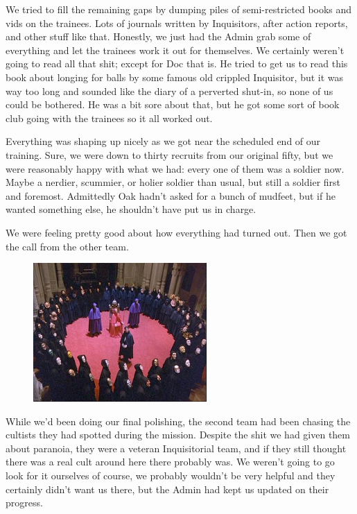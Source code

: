 We tried to fill the remaining gaps by dumping piles of semi-restricted books and vids on the trainees. 
Lots of journals written by Inquisitors, after action reports, and other stuff like that. 
Honestly, we just had the Admin grab some of everything and let the trainees work it out for themselves. 
We certainly weren’t going to read all that shit; 
except for Doc that is. 
He tried to get us to read this book about longing for balls by some famous old crippled Inquisitor, but it was way too long and sounded like the diary of a perverted shut-in, so none of us could be bothered. 
He was a bit sore about that, but he got some sort of book club going with the trainees so it all worked out.

Everything was shaping up nicely as we got near the scheduled end of our training. 
Sure, we were down to thirty recruits from our original fifty, but we were reasonably happy with what we had: 
every one of them was a soldier now. 
Maybe a nerdier, scummier, or holier soldier than usual, but still a soldier first and foremost. 
Admittedly Oak hadn’t asked for a bunch of mudfeet, but if he wanted something else, he shouldn’t have put us in charge.

We were feeling pretty good about how everything had turned out. 
Then we got the call from the other team.

\begin{figure}
	\begin{center}
		\includegraphics[width=\figwidth]{pics/8/35.png}
	\end{center}
\end{figure}
While we’d been doing our final polishing, the second team had been chasing the cultists they had spotted during the mission. 
Despite the shit we had given them about paranoia, they were a veteran Inquisitorial team, and if they still thought there was a real cult around here there probably was. 
We weren’t going to go look for it ourselves of course, we probably wouldn’t be very helpful and they certainly didn’t want us there, but the Admin had kept us updated on their progress.

